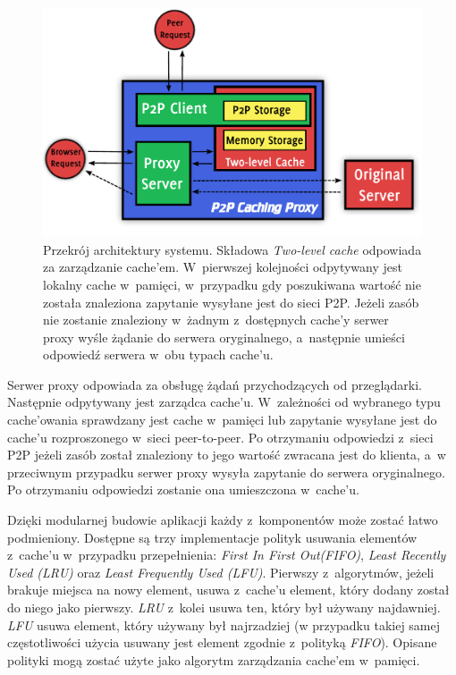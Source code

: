 \documentclass[a4paper,11pt]{scrartcl}
\newcommand{\s}{ }
\newcommand{\kesz}{cache}
\newcommand{\keszy}{cache'y}
\newcommand{\keszem}{cache'em}
\newcommand{\keszu}{cache'u}
\newcommand{\keszowania}{cache'owania}
\begin{document}
\begin{figure}[h!]
\centering
\includegraphics[width=0.9\linewidth]{img/architecture.pdf}
\caption{Przekrój architektury systemu. Składowa \textit{Two-level cache} odpowiada za zarządzanie \keszem. W~pierwszej kolejności odpytywany jest lokalny \kesz\s w~pamięci, w~przypadku gdy poszukiwana wartość nie została znaleziona zapytanie wysyłane jest do sieci P2P. Jeżeli zasób nie zostanie znaleziony w~żadnym z~dostępnych \keszy\s serwer proxy wyśle żądanie do serwera oryginalnego, a~następnie umieści odpowiedź serwera w~obu typach \keszu.}
\label{fig_architecture}
\end{figure}

Serwer proxy odpowiada za obsługę żądań przychodzących od przeglądarki. Następnie odpytywany jest zarządca \keszu. W~zależności od wybranego typu \keszowania\s sprawdzany jest \kesz\s w~pamięci lub zapytanie wysyłane jest do \keszu\s rozproszonego w~sieci peer-to-peer. Po otrzymaniu odpowiedzi z~sieci P2P jeżeli zasób został znaleziony to jego wartość zwracana jest do klienta, a~w przeciwnym przypadku serwer proxy wysyła zapytanie do serwera oryginalnego. Po otrzymaniu odpowiedzi zostanie ona umieszczona w~\keszu.

Dzięki modularnej budowie aplikacji każdy z~komponentów może zostać łatwo podmieniony. Dostępne są trzy implementacje polityk usuwania elementów z~\keszu\s w~przypadku przepełnienia: \textit{First In First Out(FIFO)}, \textit{Least Recently Used (LRU)} oraz \textit{Least Frequently Used (LFU)}. Pierwszy z~algorytmów, jeżeli brakuje miejsca na nowy element, usuwa z~\keszu\s element, który dodany został do niego jako pierwszy. \textit{LRU} z~kolei usuwa ten, który był używany najdawniej. \textit{LFU} usuwa element, który używany był najrzadziej (w przypadku takiej samej częstotliwości użycia usuwany jest element zgodnie z~polityką \textit{FIFO}). Opisane polityki mogą zostać użyte jako algorytm zarządzania \keszem\s w~pamięci. 
\end{document}
